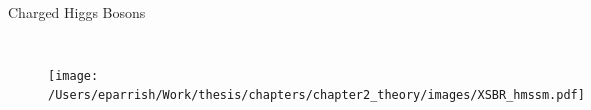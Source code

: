 \documentclass[aspectratio=169,xcolor=table]{beamer}
\begin{document}
\begin{frame}[t]{Charged Higgs Bosons}
\begin{columns}
      \centering
      \begin{figure}
      \begin{columns}
      \texttt{[image: /Users/eparrish/Work/thesis/chapters/chapter2\_theory/images/XSBR\_hmssm.pdf]}
      \caption{\tiny \cite{hpm-previous}}
      \end{columns}
      \end{figure}
      \begin{figure}
      \begin{columns}
      \includegraphics[width=1\textwidth,keepaspectratio=true]{HPlus_taunu_tanB.png}
      \caption{\tiny \cite{Higgs-Crosssections}}
      \end{columns}
      \end{figure}
      \end{columns}
    \end{frame} 
\end{document}
